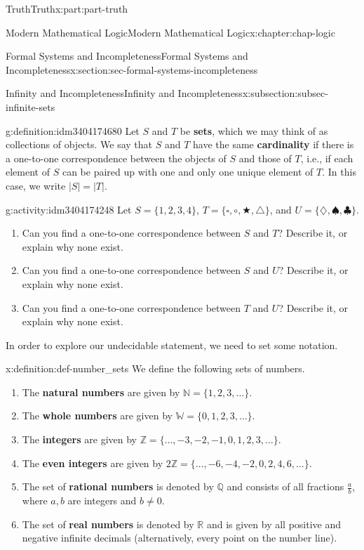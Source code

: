 \documentclass[oneside,10pt,]{book}
\newcommand{\terminology}[1]{\textbf{#1}}
\numberwithin{equation}{section}
\begin{document}
\begin{partptx}{Truth}{}{Truth}{}{}{x:part:part-truth}
\begin{chapterptx}{Modern Mathematical Logic}{}{Modern Mathematical Logic}{}{}{x:chapter:chap-logic}
\begin{sectionptx}{Formal Systems and Incompleteness}{}{Formal Systems and Incompleteness}{}{}{x:section:sec-formal-systems-incompleteness}
\begin{subsectionptx}{Infinity and Incompleteness}{}{Infinity and Incompleteness}{}{}{x:subsection:subsec-infinite-sets}
\begin{definition}{}{g:definition:idm3404174680}%
Let \(S\) and \(T\) be \terminology{sets}, which we may think of as collections of objects. We say that \(S\) and \(T\) have the same \terminology{cardinality} if there is a one-to-one correspondence between the objects of \(S\) and those of \(T\), i.e., if each element of \(S\) can be paired up with one and only one unique element of \(T\). In this case, we write \(|S| = |T|\).%
\end{definition}
\begin{activity}{}{g:activity:idm3404174248}%
Let \(S = \{1,2,3,4\}\), \(T=\{\square,\circ,\bigstar,\triangle\}\), and \(U = \{\diamondsuit,\spadesuit,\clubsuit\}\).%
%
\begin{enumerate}
\item{}Can you find a one-to-one correspondence between \(S\) and \(T\)? Describe it, or explain why none exist.%
\item{}Can you find a one-to-one correspondence between \(S\) and \(U\)? Describe it, or explain why none exist.%
\item{}Can you find a one-to-one correspondence between \(T\) and \(U\)? Describe it, or explain why none exist.%
\end{enumerate}
\end{activity}%
In order to explore our undecidable statement, we need to set some notation.%
\begin{definition}{}{x:definition:def-number_sets}%
We define the following sets of numbers.%
%
\begin{enumerate}
\item{}The \terminology{natural numbers} are given by \(\mathbb{N} = \{1, 2, 3, \ldots\}\).%
\item{}The \terminology{whole numbers} are given by \(\mathbb{W} = \{0,1,2,3,\ldots\}\).%
\item{}The \terminology{integers} are given by \(\mathbb{Z} = \{\ldots, -3, -2, -1, 0, 1, 2, 3, \ldots\}\).%
\item{}The \terminology{even integers} are given by \(2\mathbb{Z} = \{\ldots, -6, -4, -2, 0, 2, 4, 6, \ldots\}\).%
\item{}The set of \terminology{rational numbers} is denoted by \(\mathbb{Q}\) and consists of all fractions \(\frac{a}{b}\), where \(a,b\) are integers and \(b\ne 0\).%
\item{}The set of \terminology{real numbers} is denoted by \(\mathbb{R}\) and is given by all positive and negative infinite decimals (alternatively, every point on the number line).%

\end{enumerate}
\end{definition}
\end{subsectionptx}
\end{sectionptx}
\end{chapterptx}
\end{partptx}
\end{document}
